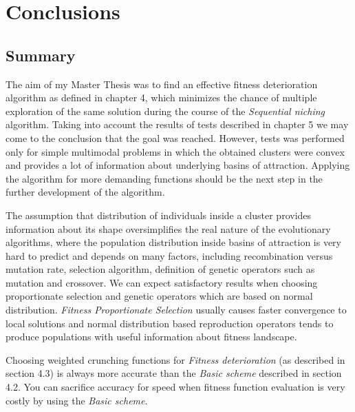 
\chapter{Conclusions}
\label{Conclusions}

\section{Summary}
The aim of my Master Thesis was to find an effective fitness deterioration
algorithm as defined in chapter 4, which minimizes the chance of multiple
exploration of the same solution during the course of the \textit{Sequential
niching} algorithm. Taking into account the results of tests described in
chapter 5 we may come to the conclusion that the goal was reached. However,
tests was performed only for simple
multimodal problems in which the obtained clusters were convex and provides 
a lot of information about underlying basins of attraction. Applying the
algorithm for more demanding functions should be the next step in the further
development of the algorithm.  

The assumption that distribution of individuals inside a cluster provides
information about its shape oversimplifies the real nature of the evolutionary
algorithms, where the population distribution inside basins of attraction is 
very hard to predict and depends on many factors, including recombination versus
mutation rate, selection algorithm, definition of genetic operators such as
mutation and crossover. We can expect satisfactory results when
choosing proportionate selection and genetic operators which are based on normal
distribution. \textit{Fitness Proportionate Selection} usually causes faster
convergence to local solutions and normal distribution based reproduction operators tends 
to produce populations with useful information about fitness landscape.

Choosing weighted crunching functions for \textit{Fitness deterioration}
(as described in section 4.3) is always more accurate than the
\textit{Basic scheme} described in section 4.2. 
You can sacrifice accuracy for speed when fitness function
evaluation is very costly by using the \textit{Basic scheme}.

